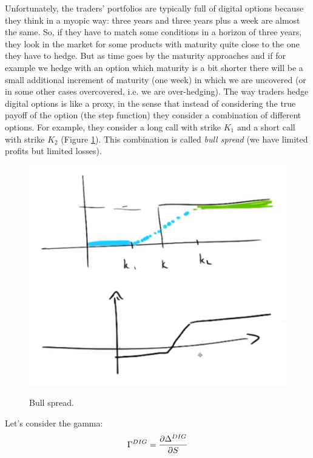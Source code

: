 Unfortunately, the traders' portfolios are typically full of digital options because they think in a myopic way: three years and three years plus a week are almost the same. So, if they have to match some conditions in a horizon of three years, they look in the market for some products with maturity quite close to the one they have to hedge. But as time goes by the maturity approaches and if for example we hedge with an option which maturity is a bit shorter there will be a small additional increment of maturity (one week) in which we are uncovered (or in some other cases overcovered, i.e. we are over-hedging). The way traders hedge digital options is like a proxy, in the sense that instead of considering the true payoff of the option (the step function) they consider a combination of different options. For example, they consider a long call with strike $K_1$ and a short call with strike $K_2$ (Figure \ref{fig:dighedge}). This combination is called \emph{bull spread} (we have limited profits but limited losses).
\begin{figure}[htp]
    \centering
    \includegraphics[scale=0.3]{fig/tmp/fig26.png}
    \includegraphics[scale=0.3]{fig/tmp/fig27.png}
    \caption{Bull spread.}
    \label{fig:dighedge}
\end{figure}
\newline Let's consider the gamma:
\begin{equation}
    \Gamma^{DIG} = \pdv{\Delta^{DIG}}{S}
\end{equation}
